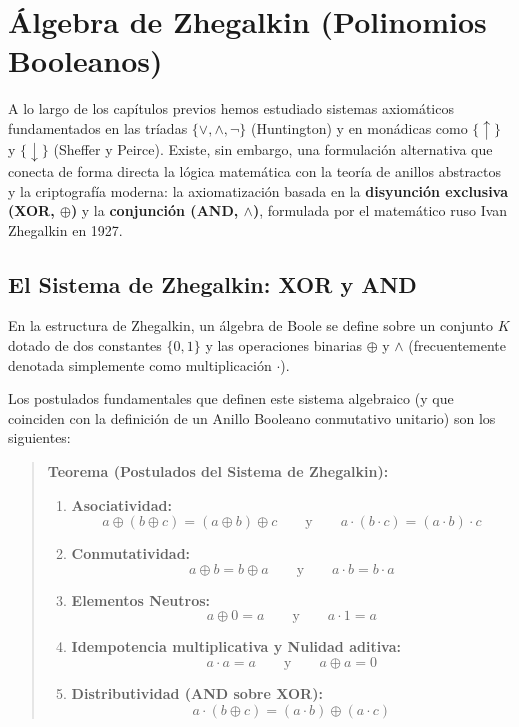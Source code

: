 \chapter{Álgebra de Zhegalkin (Polinomios Booleanos)}
\label{capitulo:zhegalkin}

A lo largo de los capítulos previos hemos estudiado sistemas axiomáticos fundamentados en las tríadas $\{\vee, \wedge, \neg\}$ (Huntington) y en monádicas como $\{\uparrow\}$ y $\{\downarrow\}$ (Sheffer y Peirce). Existe, sin embargo, una formulación alternativa que conecta de forma directa la lógica matemática con la teoría de anillos abstractos y la criptografía moderna: la axiomatización basada en la \textbf{disyunción exclusiva (XOR, $\oplus$)} y la \textbf{conjunción (AND, $\wedge$)}, formulada por el matemático ruso Ivan Zhegalkin en 1927.

\section{El Sistema de Zhegalkin: XOR y AND}

En la estructura de Zhegalkin, un álgebra de Boole se define sobre un conjunto $K$ dotado de dos constantes $\{0, 1\}$ y las operaciones binarias $\oplus$ y $\wedge$ (frecuentemente denotada simplemente como multiplicación $\cdot$). 

Los postulados fundamentales que definen este sistema algebraico (y que coinciden con la definición de un Anillo Booleano conmutativo unitario) son los siguientes:

\begin{quote}\textbf{Teorema (Postulados del Sistema de Zhegalkin):}\label{zhegalkin_postulados}
\begin{enumerate}
    \item \textbf{Asociatividad:} 
    \[ a \oplus (b \oplus c) = (a \oplus b) \oplus c \qquad \text{y} \qquad a \cdot (b \cdot c) = (a \cdot b) \cdot c \]
    \item \textbf{Conmutatividad:} 
    \[ a \oplus b = b \oplus a \qquad \text{y} \qquad a \cdot b = b \cdot a \]
    \item \textbf{Elementos Neutros:} 
    \[ a \oplus 0 = a \qquad \text{y} \qquad a \cdot 1 = a \]
    \item \textbf{Idempotencia multiplicativa y Nulidad aditiva:} 
    \[ a \cdot a = a \qquad \text{y} \qquad a \oplus a = 0 \]
    \item \textbf{Distributividad (AND sobre XOR):} 
    \[ a \cdot (b \oplus c) = (a \cdot b) \oplus (a \cdot c) \]
\end{enumerate}
\end{quote}


